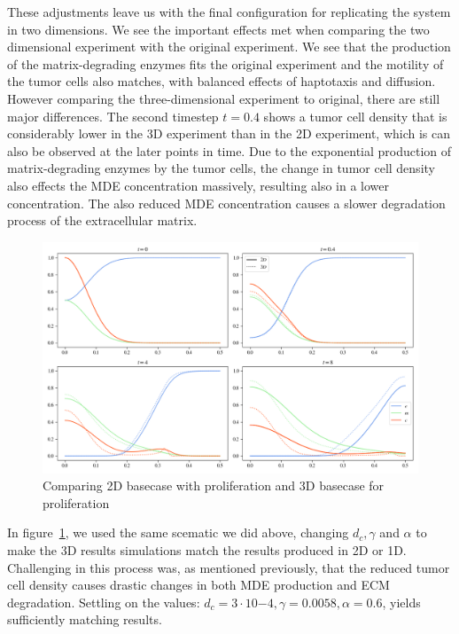 These adjustments leave us with the final configuration for replicating the system in two dimensions. We see the important effects met when comparing the two dimensional experiment with the original experiment. We see that the production of the matrix-degrading enzymes fits the original experiment and the motility of the tumor cells also matches, with balanced effects of haptotaxis and diffusion. However comparing the three-dimensional experiment to original, there are still major differences. The second timestep $t=0.4$ shows a tumor cell density that is considerably lower in the 3D experiment than in the 2D experiment, which is can also be observed at the later points in time. Due to the exponential production of matrix-degrading enzymes by the tumor cells, the change in tumor cell density also effects the MDE concentration massively, resulting also in a lower concentration. The also reduced MDE concentration causes a slower degradation process of the extracellular matrix.

\begin{figure}[h!]
    \centering
    \includegraphics[width=\textwidth]{resources/images/basecase_replication.png}
    \caption{Comparing 2D basecase with proliferation and 3D basecase for proliferation}
    \label{fig:3D_basecase_comparison}
\end{figure}

In figure~\ref{fig:3D_basecase_comparison}, we used the same scematic we did above, changing $d_c,\gamma$ and $\alpha$ to make the 3D results simulations match the results produced in 2D or 1D. Challenging in this process was, as mentioned previously, that the reduced tumor cell density causes drastic changes in both MDE production and ECM degradation. Settling on the values: $d_c=3 \cdot 10{-4}, \gamma=0.0058, \alpha=0.6$, yields sufficiently matching results.


